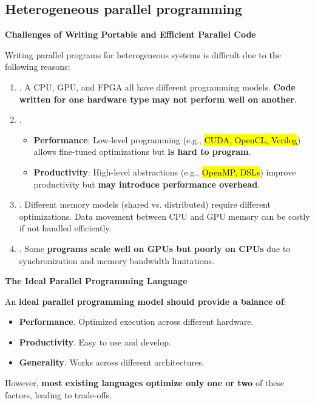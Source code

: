 \subsection{Heterogeneous parallel programming}

\begin{flushleft}
    \textcolor{Red2}{ \textbf{Challenges of Writing Portable and Efficient Parallel Code}}
\end{flushleft}
Writing parallel programs for heterogeneous systems is difficult due to the following reasons:
\begin{enumerate}
    \item {}. A CPU, GPU, and FPGA all have different programming models. \textbf{Code written for one hardware type may not perform well on another}.
    
    \item {}.
    \begin{itemize}
        \item \textbf{Performance}: Low-level programming (e.g., \hl{CUDA, OpenCL, Verilog}) allows fine-tuned optimizations but \textbf{is hard to program}.
        \item \textbf{Productivity}: High-level abstractions (e.g., \hl{OpenMP, DSLs}) improve productivity but \textbf{may introduce performance overhead}.
    \end{itemize}

    \item {}. Different memory models (shared vs. distributed) require different optimizations. Data movement between CPU and GPU memory can be costly if not handled efficiently.

    \item {}. Some \textbf{programs scale well on GPUs but poorly on CPUs} due to synchronization and memory bandwidth limitations.
\end{enumerate}

\begin{flushleft}
    \textcolor{Green3}{ \textbf{The Ideal Parallel Programming Language}}
\end{flushleft}
An \textbf{ideal parallel programming model should provide a balance of}:
\begin{itemize}[label=\textcolor{Green3}{}]
    \item \textcolor{Green3}{\textbf{Performance}}. Optimized execution across different hardware.
    \item \textcolor{Green3}{\textbf{Productivity}}. Easy to use and develop.
    \item \textcolor{Green3}{\textbf{Generality}}. Works across different architectures.
\end{itemize}
However, \textbf{most existing languages optimize only one or two} of these factors, leading to trade-offs.


